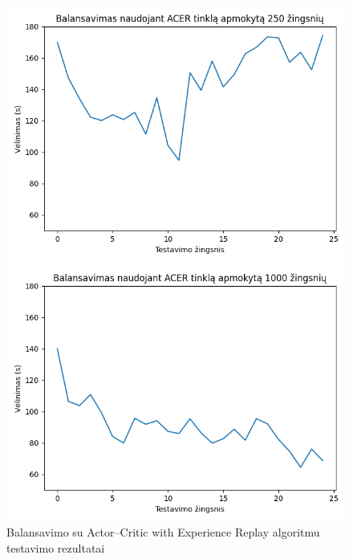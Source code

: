 \documentclass{VUMIFPSbakalaurinis}
\begin{document}
\begin{figure}[H]
\begin{minipage}[b]{0.45\textwidth}
        \includegraphics[width=\textwidth]{img/acer_250_2.png}
    \end{minipage}
    \hspace{1mm}
    \begin{minipage}[b]{0.45\textwidth}
        \includegraphics[width=\textwidth]{img/acer_1000_2.png}
    \end{minipage}
    \caption{Balansavimo su Actor–Critic with Experience Replay algoritmu testavimo rezultatai}
    \label{acer–rez}
\end{figure}
\end{document}
